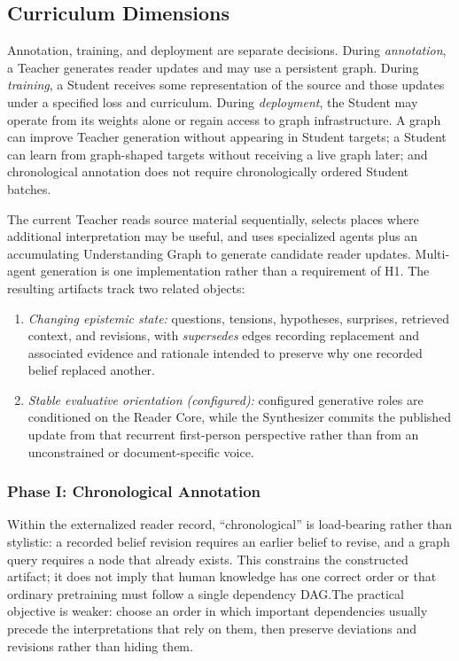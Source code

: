 \subsection{Curriculum Dimensions}\label{sec:concept-to-curriculum}

Annotation, training, and deployment are separate decisions. During
\emph{annotation}, a Teacher generates reader updates and may use a persistent
graph. During \emph{training}, a Student receives some representation of the
source and those updates under a specified loss and curriculum. During
\emph{deployment}, the Student may operate from its weights alone or regain
access to graph infrastructure. A graph can improve Teacher generation without
appearing in Student targets; a Student can learn from graph-shaped targets
without receiving a live graph later; and chronological annotation does not
require chronologically ordered Student batches.

The current Teacher reads source material sequentially, selects places where
additional interpretation may be useful, and uses specialized agents plus an
accumulating Understanding Graph to generate candidate reader updates.
Multi-agent generation is one implementation rather than a requirement of H1.
The resulting artifacts track two related objects:

\begin{enumerate}[leftmargin=*,itemsep=0.3em]
    \item \emph{Changing epistemic state:} questions, tensions, hypotheses,
    surprises, retrieved context, and revisions, with \emph{supersedes} edges
    recording replacement and associated evidence and rationale intended to
    preserve why one recorded belief replaced another.
    \item \emph{Stable evaluative orientation (configured):} configured generative roles are
    conditioned on the Reader Core, while the Synthesizer commits the published
    update from that recurrent first-person perspective rather than from an
    unconstrained or document-specific voice.
\end{enumerate}

\subsubsection{Phase I: Chronological Annotation}\label{sec:annotation-phase}

Within the externalized reader record, ``chronological'' is load-bearing rather
than stylistic: a recorded belief revision requires an earlier belief to revise,
and a graph query requires a node that already exists. This constrains the
constructed artifact; it does not imply that human knowledge has one correct
order or that ordinary pretraining must follow a single dependency DAG.\@ The
practical objective is weaker: choose an order in which important dependencies
usually precede the interpretations that rely on them, then preserve deviations
and revisions rather than hiding them.

